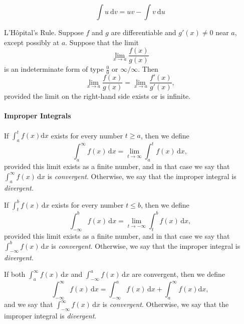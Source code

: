 \documentclass[captions=tableheading]{scrbook}
\begin{document}
\begin{equation}
\int u\:\mathrm{d} v=uv-\int v\:\mathrm{d} u
\end{equation}
\begin{thm}
L'H\^ opital's Rule. Suppose $f$ and $g$ are differentiable and $g'(x)\neq0$ near $a$, except possibly at $a$. Suppose that the limit 
\begin{equation}
\lim_{x\to a}\frac{f(x)}{g(x)}
\end{equation}
is an indeterminate form of type $\frac{0}{0}$ or $\infty/\infty$. Then
\begin{equation}
\lim_{x\to a}\frac{f(x)}{g(x)}=\lim_{x\to a}\frac{f'(x)}{g'(x)},
\end{equation}
provided the limit on the right-hand side exists or is infinite.
\end{thm}

\paragraph*{Improper Integrals}

If $\int_{a}^{t}f(x)\mathrm{d} x$ exists for every number $t\geq a$, then we define 
\begin{equation}
\int_{a}^{\infty}f(x)\,\mathrm{d} x=\lim_{t\to\infty}\int_{a}^{t}f(x)\,\mathrm{d} x,
\end{equation}
provided this limit exists as a finite number, and in that case we say that $\int_{a}^{\infty}f(x)\,\mathrm{d} x$ is \emph{convergent}. Otherwise, we say that the improper integral is \emph{divergent}.

If $\int_{t}^{b}f(x)\,\mathrm{d} x$ exists for every number $t\leq b$, then we define
\begin{equation}
\int_{-\infty}^{b}f(x)\,\mathrm{d} x=\lim_{t\to-\infty}\int_{t}^{b}f(x)\,\mathrm{d} x,
\end{equation}
provided this limit exists as a finite number, and in that case we say that $\int_{-\infty}^{b}f(x)\,\mathrm{d} x$ is \emph{convergent}. Otherwise, we say that the improper integral is \emph{divergent}.

If both $\int_{a}^{\infty}f(x)\,\mathrm{d} x$ and $\int_{-\infty}^{a}f(x)\,\mathrm{d} x$ are convergent, then we define
\begin{equation}
\int_{-\infty}^{\infty}f(x)\,\mathrm{d} x=\int_{-\infty}^{a}f(x)\,\mathrm{d} x+\int_{a}^{\infty}f(x)\mathrm{d} x,
\end{equation}
and we say that $\int_{-\infty}^{\infty}f(x)\,\mathrm{d} x$ is \emph{convergent}. Otherwise, we say that the improper integral is \emph{divergent}.
\end{document}
